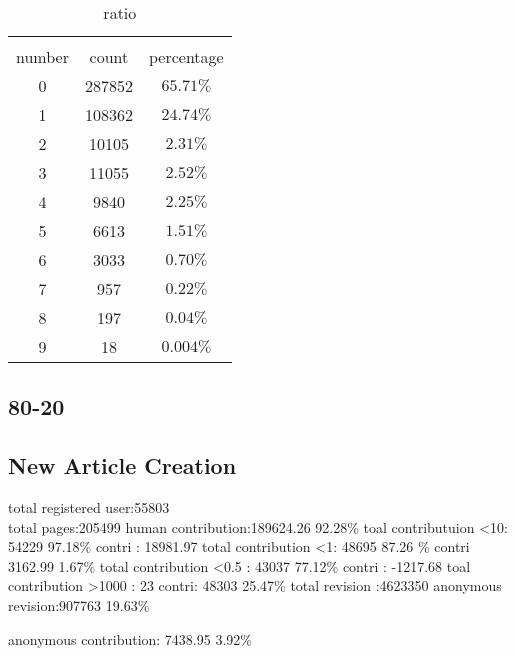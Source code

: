 \documentclass{elsarticle}
\begin{document}
\begin{table}
    \centering
    \caption{ratio}
    \begin{tabular}[center]{|c|c|c}
      \hline\\
      number & count & percentage \\\hline
      0 & 287852& $65.71\%$\\\hline
 1 & 108362& $24.74\%$\\\hline
      2 & 10105& $2.31\%$\\\hline
      3 & 11055& $2.52\%$\\\hline
      4 & 9840&$2.25\%$ \\\hline
      5 & 6613& $1.51\%$\\\hline
      6 & 3033& $0.70\%$\\\hline
      7 & 957& $0.22\%$\\\hline
      8 & 197& $0.04\%$\\\hline
      9 & 18& $0.004\%$\\\hline
     
    \end{tabular}
   
 \end{table}
  
\subsection{80-20}
\label{sec:80-20}

\subsection{New Article Creation}
\label{sec:new-article-creation}



total registered user:55803 \\

total pages:205499
human contribution:189624.26 92.28\%
toal contributuion <10: 54229  97.18\%  contri : 18981.97
total contribution <1: 48695 87.26 \%  contri 3162.99 1.67\%
total contribution <0.5 : 43037 77.12\%  contri : -1217.68
toal contribution >1000 : 23  contri: 48303 25.47\%
total revision :4623350
anonymous revision:907763 19.63\%

anonymous contribution: 7438.95 3.92\%


\end{document}
